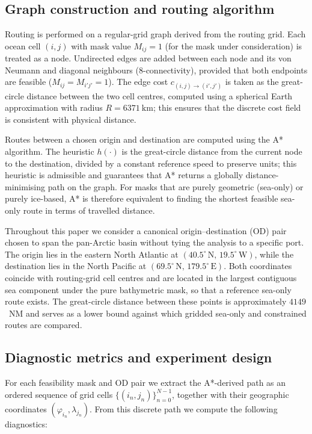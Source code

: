 \subsection{Graph construction and routing algorithm}
\label{sec:routing_method}

Routing is performed on a regular-grid graph derived from the routing
grid. Each ocean cell $(i,j)$ with mask value $M_{ij}=1$ (for the mask
under consideration) is treated as a node. Undirected edges are added
between each node and its von Neumann and diagonal neighbours
(8-connectivity), provided that both endpoints are feasible
($M_{ij}=M_{i'j'}=1$). The edge cost $c_{(i,j)\to(i',j')}$ is taken as
the great-circle distance between the two cell centres, computed using
a spherical Earth approximation with radius $R=6371~\mathrm{km}$; this
ensures that the discrete cost field is consistent with physical
distance.

Routes between a chosen origin and destination are computed using the
A* algorithm. The heuristic $h(\cdot)$ is the great-circle distance from
the current node to the destination, divided by a constant reference
speed to preserve units; this heuristic is admissible and guarantees
that A* returns a globally distance-minimising path on the graph. For
masks that are purely geometric (sea-only) or purely ice-based, A* is
therefore equivalent to finding the shortest feasible sea-only route in
terms of travelled distance.

Throughout this paper we consider a canonical origin--destination (OD)
pair chosen to span the pan-Arctic basin without tying the analysis to a
specific port. The origin lies in the eastern North Atlantic at
$(40.5^{\circ}\,\mathrm{N},\,19.5^{\circ}\,\mathrm{W})$, while the
destination lies in the North Pacific at
$(69.5^{\circ}\,\mathrm{N},\,179.5^{\circ}\,\mathrm{E})$. Both
coordinates coincide with routing-grid cell centres and are located in
the largest contiguous sea component under the pure bathymetric mask,
so that a reference sea-only route exists. The great-circle distance
between these points is approximately $4149$~NM and serves as a lower
bound against which gridded sea-only and constrained routes are
compared.

\subsection{Diagnostic metrics and experiment design}
\label{sec:diagnostics}

For each feasibility mask and OD pair we extract the A*-derived path as
an ordered sequence of grid cells
$\{(i_n,j_n)\}_{n=0}^{N-1}$, together with their geographic
coordinates $(\varphi_{i_n}, \lambda_{j_n})$. From this discrete path we
compute the following diagnostics:

